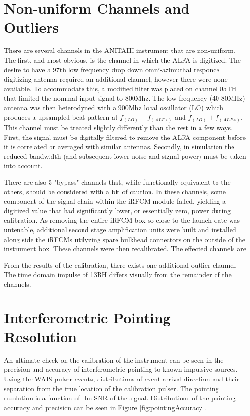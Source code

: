 \section{Non-uniform Channels and Outliers}
	There are several channels in the ANITAIII instrument that are non-uniform.  The first, and most obvious, is the channel in which the ALFA is digitized.  The desire to have a 97th low frequency drop down omni-azimuthal responce digitizing antenna required an additional channel, however there were none available.  To accommodate this, a modified filter was placed on channel 05TH that limited the nominal input signal to 800Mhz.  The low frequency (40-80MHz) antenna was then heterodyned with a 900Mhz local oscillator (LO) which produces a upsampled beat pattern at $f_(LO)-f_(ALFA)$ and $f_(LO)+f_(ALFA)$. This channel must be treated slightly differently than the rest in a few ways.  First, the signal must be digitally filtered to remove the ALFA component before it is correlated or averaged with similar antennas.  Secondly, in simulation the reduced bandwidth (and subsequent lower noise and signal power) must be taken into account.
	
	There are also 5 "bypass" channels that, while functionally equivalent to the others, should be considered with a bit of caution.  In these channels, some component of the signal chain within the iRFCM module failed, yielding a digitized value that had significantly lower, or essentially zero, power during calibration.  As removing the entire iRFCM box so close to the launch date was untenable, additional second stage amplification units were built and installed along side the iRFCMs utilyzing spare bulkhead connectors on the outside of the instrument box.  These channels were then recalibrated.  The effected channels are 

	From the results of the calibration, there exists one additional outlier channel.  The time domain impulse of 13BH differs visually from the remainder of the channels.  


\section{Interferometric Pointing Resolution}
	An ultimate check on the calibration of the instrument can be seen in the precision and accuracy of interferometric pointing to known impulsive sources.  Using the WAIS pulser events, distributions of event arrival direction and their separation from the true location of the calibration pulser.  The pointing resolution is a function of the SNR of the signal.  Distributions of the pointing accuracy and precision can be seen in Figure \ref{fig:pointingAccuracy}.
	

